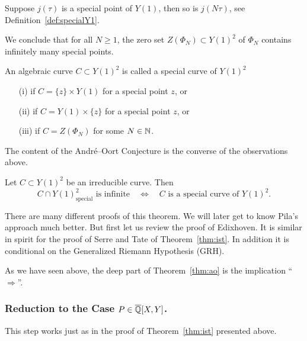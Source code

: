 Suppose $j(\tau)$ is a special point of $Y(1)$, then so is $j(N\tau)$,
see Definition~\ref{def:specialY1}.

We conclude that for all $N\ge 1$, the zero set $Z(\Phi_N)\subset
Y(1)^2$ of $\Phi_N$ contains infinitely many special points.

\begin{definition}
  An algebraic curve  $C\subset Y(1)^2$ is called a special curve of
  $Y(1)^2$ 
  \begin{enumerate}
  \item [(i)] if $C = \{z\}\times Y(1)$ for a special point $z$, or
\item [(ii)] if $C =  Y(1)\times \{z\}$ for a special point $z$, or
\item[(iii)] if $C=Z(\Phi_N)$ for some $N\in{\mathbb{N}}$. 
\end{enumerate}
\end{definition}

The content of the Andr\'e--Oort Conjecture is the converse of the
observations above.

\begin{theorem}
  \label{thm:ao}
  Let $C\subset Y(1)^2$ be an irreducible curve. Then
  \begin{equation*}
    C \cap Y(1)^2_{\mathrm{special}}\text{ is
      infinite}\quad\Longleftrightarrow\quad \text{$C$ is a special
      curve of $Y(1)^2$}. 
  \end{equation*}  
\end{theorem}

There are many different proofs of this theorem. We will later get to
know Pila's approach much better. But first let us review the proof of
Edixhoven. It is similar in spirit for the proof of Serre and Tate of
Theorem~\ref{thm:ist}. In addition it is conditional on the Generalized
Riemann Hypothesis (GRH).

As we have seen above, the deep part of Theorem~\ref{thm:ao} is the
implication
``$\Longrightarrow$''.

\subsubsection{Reduction to the Case $P \in {\overline{\mathbb{Q}}}[X,Y]$.}
This step works just as in the proof of Theorem~\ref{thm:ist}
presented above.


